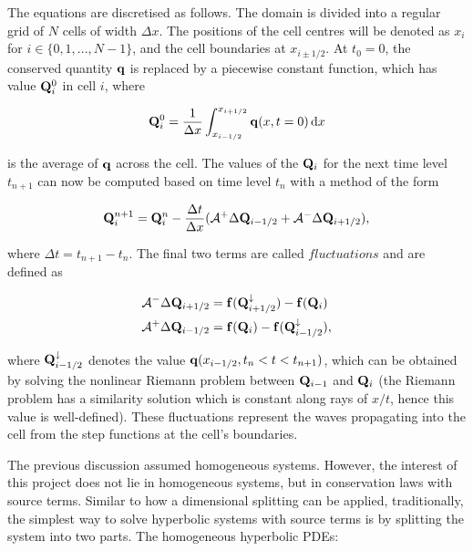 The equations are discretised as follows. The domain is divided into a regular grid of $N$ cells of width $\Delta x$. The positions of the cell centres will be denoted as $x_i$ for $i \in \{0, 1, ..., N-1\}$, and the cell boundaries at $x_{i \pm 1/2}$. At $t_0 = 0$, the conserved quantity $\vb q$ is replaced by a piecewise constant function, which has value $\vb Q_i^0$ in cell $i$, where

\begin{equation}
  \vb Q_i^0 = \frac{1}{\Delta x} \int_{x_{i-1/2}}^{x_{i+1/2}} \vb q(x, t=0)\,\dd x
\end{equation}

is the average of $\vb q$ across the cell. The values of the $\vb Q_i$ for the next time level $t_{n+1}$ can now be computed based on time level $t_n$ with a method of the form

\begin{equation}
\label{eq:wpf}
  \vb Q_i^{n+1} = \vb Q_i^n - \frac{\Delta t}{\Delta x} (\mathcal{A}^+ \Delta \vb Q_{i-1/2} + \mathcal{A}^- \Delta \vb Q_{i+1/2}),
\end{equation}

where $\Delta t = t_{n+1} - t_n$. The final two terms are called $fluctuations$ and are defined as

\begin{subequations}
\label{eq:fluctuations}
\begin{align}
  \mathcal{A}^- \Delta \vb Q_{i+1/2} &= \vb f(\vb Q_{i+1/2}^\downarrow) - \vb f(\vb Q_{i}) \\
  \mathcal{A}^+ \Delta \vb Q_{i-1/2} &= \vb f(\vb Q_{i}) - \vb f(\vb Q_{i-1/2}^\downarrow),
\end{align}
\end{subequations}

where $\vb Q_{i-1/2}^\downarrow$ denotes the value $\vb q(x_{i-1/2}, t_n < t < t_{n+1})$, which can be obtained by solving the nonlinear Riemann problem between $\vb Q_{i-1}$ and $\vb Q_i$ (the Riemann problem has a similarity solution which is constant along rays of $x/t$, hence this value is well-defined). These fluctuations represent the waves propagating into the cell from the step functions at the cell's boundaries.

The previous discussion assumed homogeneous systems. However, the interest of this project does not lie in homogeneous systems, but in conservation laws with source terms. Similar to how a dimensional splitting can be applied, traditionally, the simplest way to solve hyperbolic systems with source terms is by splitting the system into two parts. The homogeneous hyperbolic PDEs:

